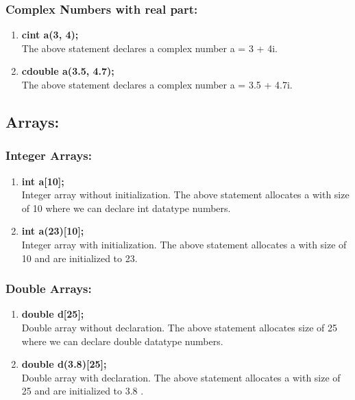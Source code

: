 \documentclass[12pt]{article}
\begin{document}
\subsubsection{Complex Numbers with real part:}
\begin{enumerate}
    \item \textbf{cint a(3, 4);}\\
The above statement declares a complex number a = 3 + 4i.
    \item \textbf{cdouble a(3.5, 4.7);}\\
The above statement declares a complex number a = 3.5 + 4.7i.
\end{enumerate}
\subsection{Arrays:}
\subsubsection{Integer Arrays:} 
\begin{enumerate}
    \item \textbf{int a[10];}\\
Integer array without initialization.
The above statement allocates a with size of 10 where we can declare int datatype numbers.
\item \textbf{int a(23)[10];} \\
Integer array with initialization.
The above statement allocates a with size of 10 and are initialized to 23.
\end{enumerate}

\subsubsection{Double Arrays:} 
\begin{enumerate}
    \item \textbf{double d[25]; } \\
Double array without declaration.
The above statement allocates size of 25 where we can declare double datatype numbers.
\item \textbf{double d(3.8)[25]; } \\
Double array with declaration.
The above statement allocates a with size of 25 and are initialized to 3.8 .
\end{enumerate}
\end{document}
